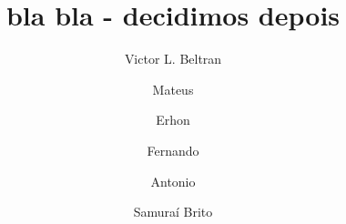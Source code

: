 \def\ZZ{\mathbbm{Z}}
\def\RR{\mathbbm{R}}
\def\CC{\mathbbm{C}}
\def\R{\mathbbm{R}}
\def\FF{\mathbbm{F}}
\def\NN{\mathbbm{N}}
\def\EE{\mathbbm{E}}
\def\AA{\mathcal{A}}
\def\ee{\epsilon}
\def\II{\mathcal{I}}
\def\SS{\mathcal{S}}
\def\XX{\mathcal{X}}
\def\MM{\mathcal{M}}
\def\op{\mathrm{op}}
\def\aux{\textrm{aux}}
\def\1{\mathbf{1}}
\def\0{\mathbf{0}}
\def\o{\mathbb{O}}

\def\minimize{\textrm{minimize}}
\def\st{\textrm{subject to }}

\DeclareMathOperator*{\maximize}{Maximize}

\def\H{\mathcal{H}}
\def\Acal{\mathcal{A}}
\def\Fou{\mathcal{F}}
\def\Id{\mathbbm{1}}
\def\I{\mathbbm{I}}
\def\spacedot{\,\cdot\,}
\def\p{\mathbf{p}}
\def\P{\mathcal{P}}
\def\ci{\perp\!\!\!\perp}

\newcommand{\operp}{\ensuremath{\text{\textcircled{$\perp$}}}}

\DeclareMathOperator{\Sym}{Sym}
\DeclareMathOperator{\Ad}{Ad}
\DeclareMathOperator{\tr}{tr}
\DeclareMathOperator{\Tr}{Tr}
\DeclareMathOperator{\rank}{rank}
\DeclareMathOperator{\range}{range}
\DeclareMathOperator{\Span}{span}
\DeclareMathOperator{\supp}{supp}
\DeclareMathOperator{\const}{const}
\DeclareMathOperator{\Circ}{Circ}
\DeclareMathOperator{\ord}{ord}
\DeclareMathOperator{\minarg}{minarg}
\DeclareMathOperator{\sign}{sgn}


\def\b{\mathbf{b}}
\def\c{\mathbf{c}}
\def\d{\mathbf{d}}
\def\e{\mathbf{e}}
\def\t{\mathbf{t}}
\def\u{\mathbf{u}}
\def\p{\mathbf{p}}
\def\h{\mathbf{h}}
\def\q{\mathbf{q}}
\def\w{\mathbf{w}}
\def\x{\mathbf{x}}
\def\y{\mathbf{y}}
\def\z{\mathbf{z}}
\def\bxi{\bm{\xi}}
\def\bzeta{\bm{\zeta}}
\def\CC{\mathcal{C}}
\def\CD{\mathcal{D}}
\def\CP{\mathcal{P}}



\title{bla bla - decidimos depois}


\author{Victor L. Beltran}
\author{Mateus}

\author{Erhon}

\author{Fernando}

\author{Antonio }

\author{Samuraí Brito}

